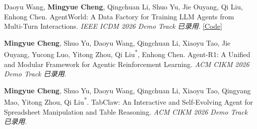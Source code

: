 \documentclass[UTF8,fontset=fandol,scheme=plain,11pt,a4paper]{ctexart}
\newcommand{\pubentry}[1]{\item \begin{minipage}[t]{\linewidth}#1\end{minipage}}
\begin{document}
\begin{publist}[start=4]
\pubentry{Daoyu Wang, \textbf{Mingyue Cheng}, Qingchuan Li, Shuo Yu, Jie Ouyang, Qi Liu, Enhong Chen. AgentWorld: A Data Factory for Training LLM Agents from Multi-Turn Interactions. \emph{IEEE ICDM 2026 Demo Track 已录用}. \href{https://github.com/AgentR1/Claw-R1}{[Code]}}

\pubentry{\textbf{Mingyue Cheng}, Shuo Yu, Daoyu Wang, Qingchuan Li, Xiaoyu Tao, Jie Ouyang, Yucong Luo, Yitong Zhou, Qi Liu\textsuperscript{*}, Enhong Chen. Agent-R1: A Unified and Modular Framework for Agentic Reinforcement Learning. \emph{ACM CIKM 2026 Demo Track 已录用}.}

\pubentry{\textbf{Mingyue Cheng}, Shuo Yu, Daoyu Wang, Qingchuan Li, Xiaoyu Tao, Qingyang Mao, Yitong Zhou, Qi Liu\textsuperscript{*}. TabClaw: An Interactive and Self-Evolving Agent for Spreadsheet Manipulation and Table Reasoning. \emph{ACM CIKM 2026 Demo Track 已录用}.}

\end{publist}

\end{document}
